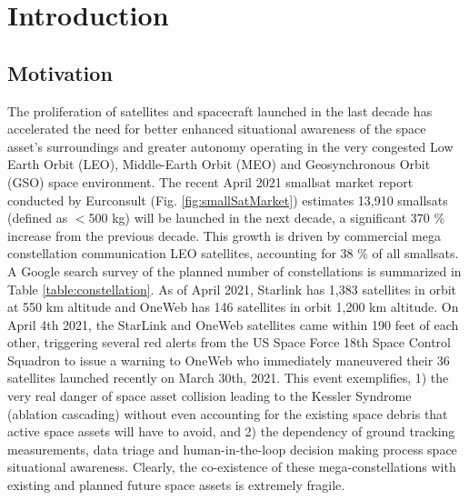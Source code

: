 \chapter{Introduction}\label{CHAP1}

\section{Motivation}\label{CHAP1_1}
The proliferation of satellites and spacecraft launched in the last decade has accelerated the need for better enhanced situational awareness of the space asset's surroundings and greater autonomy operating in the very congested Low Earth Orbit (LEO), Middle-Earth Orbit (MEO) and Geosynchronous Orbit (GSO) space environment. The recent April 2021 smallsat\footnotemark[1]{} market report conducted by Eurconsult (Fig. \ref{fig:smallSatMarket}) estimates 13,910 smallsats (defined as $<$500 kg) will be launched in the next decade, a significant 370 \% increase from the previous decade. This growth is driven by commercial mega constellation communication LEO satellites, accounting for 38 \% of all smallsats. A Google search survey of the planned number of constellations is summarized in Table \ref{table:constellation}. As of April 2021, Starlink has 1,383 satellites in orbit at 550 km altitude and OneWeb has 146 satellites in orbit 1,200 km altitude. On April 4th 2021, the StarLink and OneWeb satellites came within 190 feet of each other, triggering several red alerts from the US Space Force 18th Space Control Squadron to issue a warning to OneWeb who immediately maneuvered their 36 satellites launched recently on March 30th, 2021\footnotemark[7]{}. This event exemplifies, 1) the very real danger of space asset collision leading to the Kessler Syndrome (ablation cascading) \cite{KesslerSyndrome78} without even accounting for the existing space debris that active space assets will have to avoid, and 2) the dependency of ground tracking measurements, data triage and human-in-the-loop decision making process space situational awareness. Clearly, the co-existence of these mega-constellations with existing and planned future space assets is extremely fragile.

